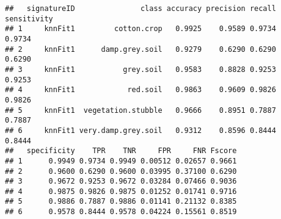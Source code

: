 \documentclass{article}
\makeatletter
\newenvironment{kframe}{%
 \def\FrameCommand##1{\hskip\@totalleftmargin \hskip-\fboxsep
 \colorbox{shadecolor}{##1}\hskip-\fboxsep
     \hskip-\linewidth \hskip-\@totalleftmargin \hskip\columnwidth}%
 \MakeFramed {\advance\hsize-\width
   \@totalleftmargin\z@ \linewidth\hsize
   \@setminipage}}%
 {\par\unskip\endMakeFramed}
\newenvironment{knitrout}{}{} %
\makeatother
\begin{document}
\begin{knitrout}
\color{fgcolor}\begin{kframe}
\begin{verbatim}
##   signatureID               class accuracy precision recall sensitivity
## 1     knnFit1         cotton.crop   0.9925    0.9589 0.9734      0.9734
## 2     knnFit1      damp.grey.soil   0.9279    0.6290 0.6290      0.6290
## 3     knnFit1           grey.soil   0.9583    0.8828 0.9253      0.9253
## 4     knnFit1            red.soil   0.9863    0.9609 0.9826      0.9826
## 5     knnFit1  vegetation.stubble   0.9666    0.8951 0.7887      0.7887
## 6     knnFit1 very.damp.grey.soil   0.9312    0.8596 0.8444      0.8444
##   specificity    TPR    TNR     FPR     FNR Fscore
## 1      0.9949 0.9734 0.9949 0.00512 0.02657 0.9661
## 2      0.9600 0.6290 0.9600 0.03995 0.37100 0.6290
## 3      0.9672 0.9253 0.9672 0.03284 0.07466 0.9036
## 4      0.9875 0.9826 0.9875 0.01252 0.01741 0.9716
## 5      0.9886 0.7887 0.9886 0.01141 0.21132 0.8385
## 6      0.9578 0.8444 0.9578 0.04224 0.15561 0.8519
\end{verbatim}
\end{kframe}
\end{knitrout}
\end{document}
